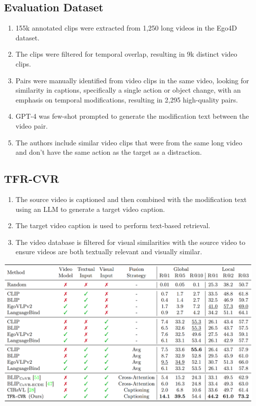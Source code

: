\documentclass{article}
\begin{document}
\subsection*{Evaluation Dataset}
\begin{enumerate}
    \item 155k annotated clips were extracted from 1,250 long videos in the Ego4D dataset.
    \item The clips were filtered for temporal overlap, resulting in 9k distinct video clips.
    \item Pairs were manually identified from video clips in the same video, looking for similarity in captions, specifically a single action or object change, with an emphasis on temporal modifications, resulting in 2,295 high-quality pairs.
    \item GPT-4 was few-shot prompted to generate the modification text between the video pair.
    \item The authors include similar video clips that were from the same long video and don't have the same action as the target as a distraction.
\end{enumerate}

\subsection*{TFR-CVR}
\begin{enumerate}
    \item The source video is captioned and then combined with the modification text using an LLM to generate a target video caption.
    \item The target video caption is used to perform text-based retrieval.
    \item The video database is filtered for visual similarities with the source video to ensure videos are both textually relevant and visually similar.
\end{enumerate}

\begin{center}
    \includegraphics[scale=0.22]{egocvr-2.png}
\end{center}
\end{document}
